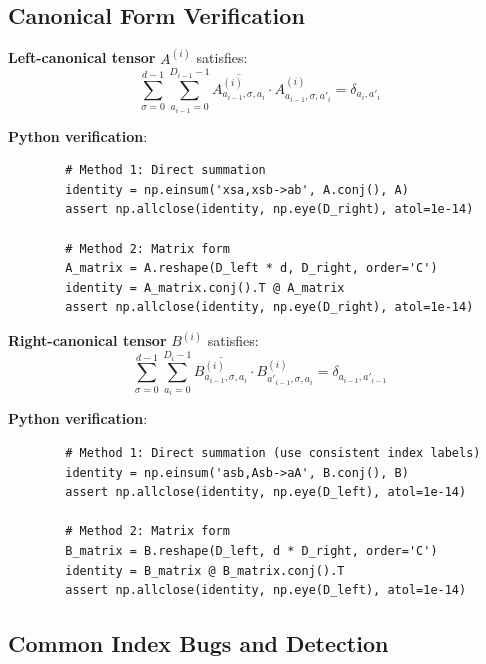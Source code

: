 \documentclass[aps,prb,onecolumn,scriptaddress]{revtex4-2}
\begin{document}
		\subsection{Canonical Form Verification}
		
		\textbf{Left-canonical tensor} $A^{(i)}$ satisfies:
		\begin{equation}
		\sum_{\sigma=0}^{d-1} \sum_{a_{i-1}=0}^{D_{i-1}-1} \overline{A^{(i)}_{a_{i-1},\sigma,a_i}} \cdot A^{(i)}_{a_{i-1},\sigma,a'_i} = \delta_{a_i, a'_i}
		\end{equation}
		
		\textbf{Python verification}:
		\begin{verbatim}
		# Method 1: Direct summation
		identity = np.einsum('xsa,xsb->ab', A.conj(), A)
		assert np.allclose(identity, np.eye(D_right), atol=1e-14)
		
		# Method 2: Matrix form
		A_matrix = A.reshape(D_left * d, D_right, order='C')
		identity = A_matrix.conj().T @ A_matrix
		assert np.allclose(identity, np.eye(D_right), atol=1e-14)
		\end{verbatim}
		
		\textbf{Right-canonical tensor} $B^{(i)}$ satisfies:
		\begin{equation}
		\sum_{\sigma=0}^{d-1} \sum_{a_i=0}^{D_i-1} \overline{B^{(i)}_{a_{i-1},\sigma,a_i}} \cdot B^{(i)}_{a'_{i-1},\sigma,a_i} = \delta_{a_{i-1}, a'_{i-1}}
		\end{equation}
		
		\textbf{Python verification}:
		\begin{verbatim}
		# Method 1: Direct summation (use consistent index labels)
		identity = np.einsum('asb,Asb->aA', B.conj(), B)
		assert np.allclose(identity, np.eye(D_left), atol=1e-14)
		
		# Method 2: Matrix form
		B_matrix = B.reshape(D_left, d * D_right, order='C')
		identity = B_matrix @ B_matrix.conj().T
		assert np.allclose(identity, np.eye(D_left), atol=1e-14)
		\end{verbatim}
		
		\subsection{Common Index Bugs and Detection}
		
\end{document}
